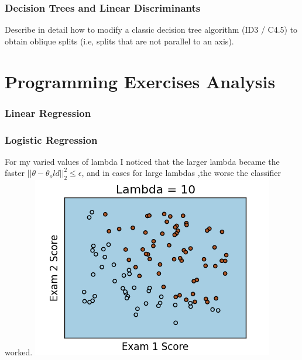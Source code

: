 \documentclass{article}
\begin{document}
 \section{Decision Trees and Linear Discriminants}
 Describe in detail how to modify a classic decision tree algorithm (ID3 / C4.5) to obtain oblique splits (i.e,
splits that are not parallel to an axis).

\part{Programming Exercises Analysis}
\section {Linear Regression} 
\section {Logistic Regression}
For my varied values of lambda I noticed that the larger lambda became the faster $||\theta -\theta_old||^{2}_2 \leq \epsilon$, and in cases for large lambdas ,the worse the classifier worked.
\linebreak
\includegraphics[width = \linewidth]{Lambda10.png}
\end{document}
